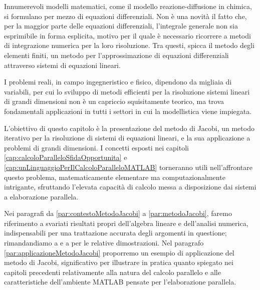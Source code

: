Innumerevoli modelli matematici, come il modello reazione-diffusione in chimica, si formulano per mezzo di equazioni 
differenziali. \newline
Non \`e una novit\`a il fatto che, per la maggior parte delle equazioni differenziali, l'integrale generale non sia esprimibile in forma esplicita, motivo per il quale \`e 
necessario ricorrere a metodi di integrazione numerica per la loro risoluzione.\newline
Tra questi, spicca il metodo degli elementi finiti, un metodo per l'approssimazione di equazioni differenziali 
attraverso sistemi di equazioni lineari.

I problemi reali, in campo ingegneristico e fisico, dipendono da migliaia di variabili, per cui lo sviluppo di metodi efficienti per la risoluzione sistemi lineari di grandi 
dimensioni non \`e un capriccio squisitamente teorico, ma trova fondamentali applicazioni in tutti i settori in cui la modellistica viene impiegata.

L'obiettivo di questo capitolo \`e la presentazione del metodo di Jacobi, un metodo iterativo per la risoluzione di sistemi di equazioni lineari, e la sua 
applicazione a problemi di grandi dimensioni.\newline
I concetti esposti nei capitoli \ref{cap:calcoloParalleloSfidaOpportunita} e \ref{cap:unLinguaggioPerIlCalcoloParalleloMATLAB} torneranno utili nell'affrontare questo problema, matematicamente elementare ma computazionalmente 
intrigante, sfruttando l'elevata capacit\`a di calcolo messa a disposizione dai sistemi a elaborazione parallela.

Nei paragrafi da \ref{par:contestoMetodoJacobi} a \ref{par:metodoJacobi}, faremo riferimento a svariati risultati propri dell'algebra lineare e dell'analisi numerica, indispensabili per una trattazione accurata degli 
argomenti in questione; rimandandiamo a \cite{Betti2000} e a \cite{Quarteroni2002} per le relative dimostrazioni.\newline
Nel paragrafo \ref{par:applicazioneMetodoJacobi} proporremo un esempio di applicazione del metodo di Jacobi, 
significativo per illustrare in pratica quanto spiegato nei capitoli precedenti relativamente alla natura del calcolo parallelo 
e alle caratteristiche dell'ambiente MATLAB pensate per l'elaborazione parallela.